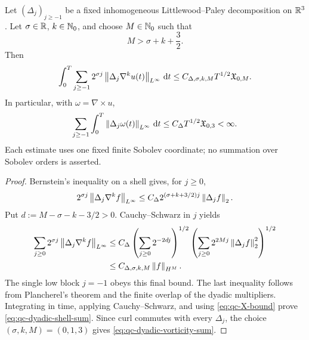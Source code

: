 \begin{proposition}
\label{prop:qc-dyadic-shell-sums}
Let \((\Delta_j)_{j\ge-1}\) be a fixed inhomogeneous
Littlewood--Paley decomposition on \(\mathbb R^3\).  Let
\(\sigma\in\mathbb R\), \(k\in\mathbb N_0\), and choose \(M\in\mathbb N_0\) such that
\begin{equation}
 M>\sigma+k+\frac32.
 \label{eq:qc-dyadic-order-condition}
\end{equation}
Then
\begin{equation}
 \int_0^T\sum_{j\ge-1}2^{\sigma j}
 \left\lVert \Delta_j\nabla^ku(t)\right\rVert_{L^\infty}\,\mathrm d t
 \le C_{\Delta,\sigma,k,M}T^{1/2}\mathfrak X_{0,M}.
 \label{eq:qc-dyadic-shell-sum}
\end{equation}
In particular, with \(\omega=\nabla\times u\),
\begin{equation}
 \sum_{j\ge-1}\int_0^T
 \left\lVert \Delta_j\omega(t)\right\rVert_{L^\infty}\,\mathrm d t
 \le C_\Delta T^{1/2}\mathfrak X_{0,3}<\infty.
 \label{eq:qc-dyadic-vorticity-sum}
\end{equation}
Each estimate uses one fixed finite Sobolev coordinate; no summation over
Sobolev orders is asserted.
\end{proposition}

\begin{proof}
Bernstein's inequality on a shell gives, for \(j\ge0\),
\[
 2^{\sigma j}\left\lVert \Delta_j\nabla^kf\right\rVert_{L^\infty}
 \le C_\Delta 2^{(\sigma+k+3/2)j}\left\lVert \Delta_jf\right\rVert_2.
\]
Put \(d:=M-\sigma-k-3/2>0\).  Cauchy--Schwarz in \(j\) yields
\begin{align*}
 \sum_{j\ge0}2^{\sigma j}
 \left\lVert \Delta_j\nabla^kf\right\rVert_{L^\infty}
 &\le C_\Delta
 \left(\sum_{j\ge0}2^{-2dj}\right)^{1/2}
 \left(\sum_{j\ge0}2^{2Mj}\left\lVert \Delta_jf\right\rVert_2^2\right)^{1/2}\\
 &\le C_{\Delta,\sigma,k,M}\left\lVert f\right\rVert_{H^M}.
\end{align*}
The single low block \(j=-1\) obeys this final bound.  The last
inequality follows from Plancherel's theorem and the finite overlap of the
dyadic multipliers.  Integrating in time, applying Cauchy--Schwarz, and using
\eqref{eq:qc-X-bound} prove \eqref{eq:qc-dyadic-shell-sum}.  Since curl
commutes with every \(\Delta_j\), the choice
\((\sigma,k,M)=(0,1,3)\) gives
\eqref{eq:qc-dyadic-vorticity-sum}.
\end{proof}

